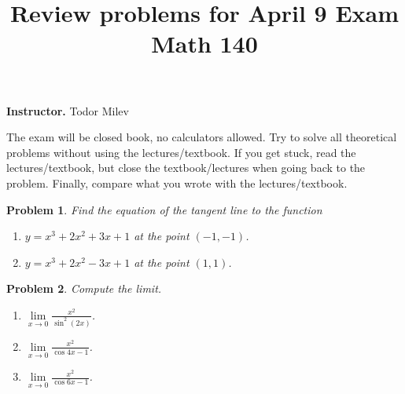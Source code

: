 \documentclass{article}
\title{
Review problems for April 9 Exam\\
Math 140 \\
}
\date{}
\newtheorem{problem}{Problem}
\begin{document}
\maketitle
\textbf{Instructor.} Todor Milev

The exam will be closed book, no calculators allowed. Try to solve all theoretical problems without using the lectures/textbook. If you get stuck, read the lectures/textbook, but close the textbook/lectures when going back to the problem. Finally, compare what you wrote with the lectures/textbook.
\begin{problem}
Find the equation of the tangent line to the function
\begin{enumerate}
\item $y=x^3+2x^2+3x+1 $ at the point $(-1, -1)$.  \hfill{~}  
\item $y=x^3+2x^2-3x+1 $ at the point $(1, 1)$.
\hfill{~}  
\end{enumerate}
\end{problem}

\begin{problem}Compute the limit.
\begin{enumerate}
\item $\lim\limits_{x\to 0} \frac{x^2}{\sin^2(2x)}$. \hfill{~}  
\item $\lim\limits_{x\to 0} \frac{x^2}{ \cos 4x -1} $.
\hfill{~}  
\item $\lim\limits_{x\to 0} \frac{x^2}{ \cos 6x -1} $.
\hfill{~}  
\end{enumerate}
\end{problem}
\end{document}
